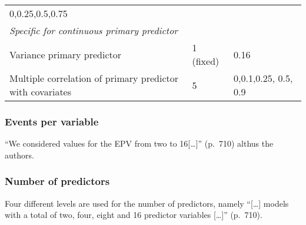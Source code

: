 \documentclass[10,a4paperpaper,]{article}
\begin{document}
\begin{longtable}[]{@{}lll@{}}
\begin{minipage}[t]{0.43\columnwidth}
0,0.25,0.5,0.75\strut
\end{minipage}\tabularnewline
\begin{minipage}[t]{0.37\columnwidth}\raggedright
\emph{Specific for continuous primary predictor}\strut
\end{minipage} & \begin{minipage}[t]{0.12\columnwidth}\raggedright
\strut
\end{minipage} & \begin{minipage}[t]{0.43\columnwidth}\raggedright
\strut
\end{minipage}\tabularnewline
\begin{minipage}[t]{0.37\columnwidth}\raggedright
Variance primary predictor\strut
\end{minipage} & \begin{minipage}[t]{0.12\columnwidth}\raggedright
1 (fixed)\strut
\end{minipage} & \begin{minipage}[t]{0.43\columnwidth}\raggedright
0.16\strut
\end{minipage}\tabularnewline
\begin{minipage}[t]{0.37\columnwidth}\raggedright
Multiple correlation of primary predictor with covariates\strut
\end{minipage} & \begin{minipage}[t]{0.12\columnwidth}\raggedright
5\strut
\end{minipage} & \begin{minipage}[t]{0.43\columnwidth}\raggedright
0,0.1,0.25, 0.5, 0.9\strut
\end{minipage}\tabularnewline
\bottomrule
\end{longtable}

\subsubsection{Events per variable}

``We considered values for the EPV from two to 16{[}\ldots{]}'' (p.~710)
althus the authors.

\subsubsection{Number of predictors}

Four different levels are used for the number of predictors, namely
``{[}\ldots{]} models with a total of two, four, eight and 16 predictor
variables {[}\ldots{]}'' (p.~710).
\end{document}
